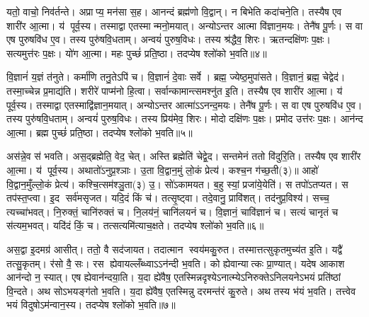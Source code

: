यतो॒ वाचो॒ निव॑र्तन्ते। अप्राप्य॒ मन॑सा स॒ह। आनन्दं ब्रह्म॑णो वि॒द्वान्। न बिभेति कदा॑चने॒ति। तस्यैष एव शारी॑र आ॒त्मा। य॑ पूर्व॒स्य। तस्माद्वा एतस्मान्मनो॒मयात्। अन्योऽन्तर आत्मा वि॑ज्ञान॒मयः। तेनै॑ष पू॒र्णः। स वा एष पुरुषवि॑ध ए॒व। तस्य पुरु॑षवि॒धताम्। अन्वयं॑ पुरुष॒विधः। तस्य श्र॑द्धैव॒ शिरः। ऋतन्दक्षि॑णः प॒क्षः। सत्यमुत्त॑रः प॒क्षः। यो॑ग आ॒त्मा। महः पुच्छं॑ प्रति॒ष्ठा। तदप्येष श्लो॑को भ॒वति॥४॥

वि॒ज्ञानं॑ य॒ज्ञं त॑नुते। कर्मा॑णि तनु॒तेऽपि॑ च। वि॒ज्ञानं॑ दे॒वाः सर्वे। ब्रह्म॒ ज्येष्ठ॒मुपा॑सते। वि॒ज्ञानं॒ ब्रह्म॒ चेद्वेद॑। तस्मा॒च्चेन्न प्र॒माद्य॑ति। शरीरे॑ पाप्म॑नो हि॒त्वा। सर्वान्कामान्त्समश्नु॑त इ॒ति। तस्यैष एव शारी॑र आ॒त्मा। य॑ पूर्व॒स्य। तस्माद्वा एतस्माद्वि॑ज्ञान॒मयात्। अन्योऽन्तर आत्मा॑ऽऽनन्द॒मयः। तेनै॑ष पू॒र्णः। स वा एष पुरुषवि॑ध ए॒व। तस्य पुरु॑षवि॒धताम्। अन्वयं॑ पुरुष॒विधः। तस्य प्रिय॑मेव॒ शिरः। मोदो दक्षि॑णः प॒क्षः। प्रमोद उत्त॑रः प॒क्षः। आन॑न्द आ॒त्मा। ब्रह्म पुच्छं॑ प्रति॒ष्ठा। तदप्येष श्लो॑को भ॒वति॥५॥

अस॑न्ने॒व स॑ भवति। अस॒द्ब्रह्मेति॒ वेद॒ चेत्। अस्ति ब्रह्मेति॑ चेद्वे॒द। सन्तमेनं ततो वि॑दुरि॒ति। तस्यैष एव शारी॑र आ॒त्मा। य॑ पूर्व॒स्य। अथातो॑ऽनुप्र॒श्ञाः। उ॒ता वि॒द्वान॒मुं लो॒कं प्रेत्य॑। कश्च॒न ग॑च्छ॒ती(३)॥ आहो॑ वि॒द्वान॒मुँल्लो॒कं प्रेत्य॑। कश्चि॒त्सम॑श्ञु॒ता(३) उ॒। सो॑ऽकामयत। ब॒हु स्यां॒ प्रजा॑ये॒येति॑। स तपो॑ऽतप्यत। स तप॑स्त॒प्त्वा। इ॒द सर्व॑मसृजत। यदि॒दं किं च॑। तत्सृ॒ष्ट्वा। तदे॒वानु॒ प्रावि॑शत्। तद॑नुप्र॒विश्य॑। सच्च॒ त्यच्चा॑भवत्। नि॒रुक्तं॒ चानि॑रुक्तं च। नि॒लय॑नं॒ चानि॑लयनं च। वि॒ज्ञानं॒ चावि॑ज्ञानं च। सत्यं चानृतं च स॑त्यम॒भवत्। यदि॑दं किं॒ च। तत्सत्यमि॑त्याच॒क्षते। तदप्येष श्लो॑को भ॒वति॥६॥

अस॒द्वा इ॒दमग्र॑ आसीत्। ततो॒ वै सद॑जायत। तदात्मान स्वय॑मकु॒रुत। तस्मात्तत्सुकृतमुच्य॑त इ॒ति। यद्वै॑ तत्सु॒कृतम्। र॑सो वै॒ सः। रस ह्येवायल्लँब्ध्वाऽऽन॑न्दी भ॒वति। को ह्येवान्यात्कः प्रा॒ण्यात्। यदेष आकाश आन॑न्दो न॒ स्यात्। एष ह्येवान॑न्दया॒ति। य॒दा ह्ये॑वैष॒ एतस्मिन्नदृश्येऽनात्म्येऽनिरुक्तेऽनिलयनेऽभयं प्रति॑ष्ठां  वि॒न्दते। अथ सोऽभयङ्ग॑तो भ॒वति। य॒दा ह्ये॑वैष॒ एतस्मिन्नु दरमन्त॑रं कु॒रुते। अथ तस्य भ॑यं भ॒वति। तत्त्वेव भयं  विदुषोऽम॑न्वान॒स्य। तदप्येष श्लो॑को भ॒वति॥७॥

